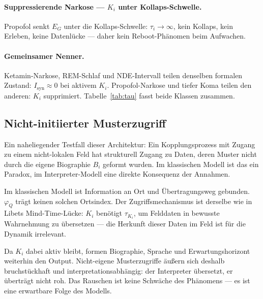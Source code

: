 \documentclass[11pt,a4paper]{article}
\begin{document}
\paragraph{Suppressierende Narkose — $K_i$ unter Kollaps-Schwelle.}
Propofol senkt $E_G$ unter die Kollaps-Schwelle: $\tau_i \to \infty$,
kein Kollaps, kein Erleben, keine Datenlücke — daher kein
Reboot-Phänomen beim Aufwachen.

\paragraph{Gemeinsamer Nenner.}
Ketamin-Narkose, REM-Schlaf und NDE-Intervall teilen denselben formalen
Zustand: $I_{\mathrm{syn}} \approx 0$ bei aktivem $K_i$.
Propofol-Narkose und tiefer Koma teilen den anderen: $K_i$ supprimiert.
Tabelle~\ref{tab:tau} fasst beide Klassen zusammen.

\subsection{Nicht-initiierter Musterzugriff}

Ein naheliegender Testfall dieser Architektur: Ein Kopplungsprozess mit
Zugang zu einem nicht-lokalen Feld hat strukturell Zugang zu Daten, deren
Muster nicht durch die eigene Biographie $B_i$ geformt wurden. Im klassischen
Modell ist das ein Paradox, im Interpreter-Modell eine direkte Konsequenz
der Annahmen.

Im klassischen Modell ist Information an Ort und Übertragungsweg gebunden.
$\varphi_Q$ trägt keinen solchen Ortsindex. Der Zugriffsmechanismus ist
derselbe wie in Libets Mind-Time-Lücke: $K_i$ benötigt $\tau_{K_i}$, um
Felddaten in bewusste Wahrnehmung zu übersetzen — die Herkunft dieser Daten
im Feld ist für die Dynamik irrelevant.

Da $K_i$ dabei aktiv bleibt, formen Biographie, Sprache und Erwartungshorizont
weiterhin den Output. Nicht-eigene Musterzugriffe äußern sich deshalb
bruchstückhaft und interpretationsabhängig: der Interpreter übersetzt, er
überträgt nicht roh. Das Rauschen ist keine Schwäche des Phänomens —
es ist eine erwartbare Folge des Modells.
\end{document}
